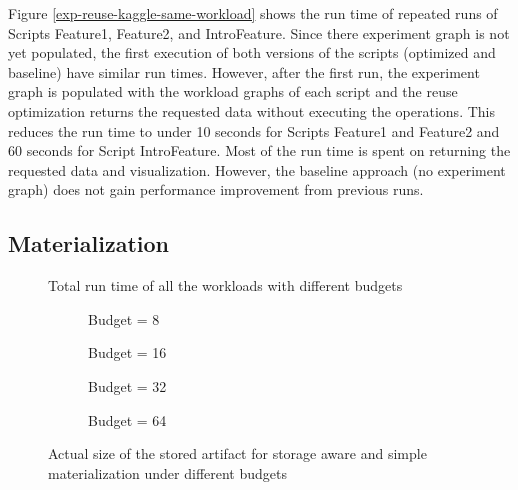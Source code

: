 Figure \ref{exp-reuse-kaggle-same-workload} shows the run time of repeated runs of Scripts Feature1,  Feature2, and IntroFeature.
Since there experiment graph is not yet populated, the first execution of both versions of the scripts (optimized and baseline) have similar run times.
However, after the first run, the experiment graph is populated with the workload graphs of each script and the reuse optimization returns the requested data without executing the operations.
This reduces the run time to under 10 seconds for Scripts Feature1 and Feature2 and 60 seconds for Script IntroFeature.
Most of the run time is spent on returning the requested data and visualization.
However, the baseline approach (no experiment graph) does not gain performance improvement from previous runs.

\subsection{Materialization}
\begin{figure}
\centering
 \resizebox{0.5\columnwidth}{!}{%
%
}
\caption{Total run time of all the workloads with different budgets}
\label{exp-runtime-vs-mat-budget}
\end{figure}

\begin{figure}
\begin{subfigure}[b]{0.5\linewidth}
\centering
 \resizebox{\columnwidth}{!}{%
%
}
\caption{Budget = 8}
\end{subfigure}%
\begin{subfigure}[b]{0.5\linewidth}
\centering
 \resizebox{\columnwidth}{!}{%
%
}

\caption{Budget = 16}
\end{subfigure}
\begin{subfigure}[b]{0.5\linewidth}
\centering
 \resizebox{\columnwidth}{!}{%
%
}

\caption{Budget = 32}
\end{subfigure}%
\begin{subfigure}[b]{0.5\linewidth}
\centering
 \resizebox{\columnwidth}{!}{%
%
}
\caption{Budget = 64}
\end{subfigure}
\caption{Actual size of the stored artifact for storage aware and simple materialization under different budgets }
\label{exp-sa-vs-simple-size}
\end{figure}

